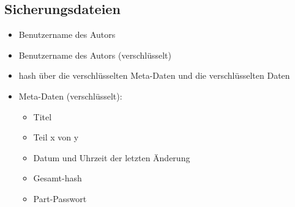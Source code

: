 \subsection{Sicherungsdateien}
\begin{itemize}
	\item Benutzername des Autors
	\item Benutzername des Autors (verschl\"usselt)
	\item \gls{hash} \"uber die verschl\"usselten Meta-Daten und die verschl\"usselten Daten
	\item Meta-Daten (verschl\"usselt):
		\begin{itemize}
			\item Titel
			\item Teil x von y
			\item Datum und Uhrzeit der letzten \"Anderung
			\item Gesamt-\gls{hash}
			\item \gls{Part-Passwort}
		\end{itemize}
\end{itemize}

